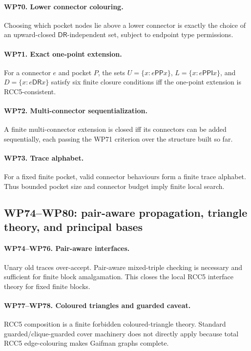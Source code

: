 \documentclass[11pt]{article}
\newcommand{\PP}{\mathsf{PP}}
\newcommand{\PPI}{\mathsf{PPI}}
\newcommand{\DR}{\mathsf{DR}}
\begin{document}
\paragraph{WP70. Lower connector colouring.}
Choosing which pocket nodes lie above a lower connector is exactly the choice of an upward-closed $\DR$-independent set, subject to endpoint type permissions.

\paragraph{WP71. Exact one-point extension.}
For a connector $e$ and pocket $P$, the sets $U=\{x:e\PP x\}$, $L=\{x:e\PPI x\}$, and $D=\{x:e\DR x\}$ satisfy six finite closure conditions iff the one-point extension is RCC5-consistent.

\paragraph{WP72. Multi-connector sequentialization.}
A finite multi-connector extension is closed iff its connectors can be added sequentially, each passing the WP71 criterion over the structure built so far.

\paragraph{WP73. Trace alphabet.}
For a fixed finite pocket, valid connector behaviours form a finite trace alphabet.  Thus bounded pocket size and connector budget imply finite local search.

\subsection{WP74--WP80: pair-aware propagation, triangle theory, and principal bases}
\paragraph{WP74--WP76. Pair-aware interfaces.}
Unary old traces over-accept.  Pair-aware mixed-triple checking is necessary and sufficient for finite block amalgamation.  This closes the local RCC5 interface theory for fixed finite blocks.

\paragraph{WP77--WP78. Coloured triangles and guarded caveat.}
RCC5 composition is a finite forbidden coloured-triangle theory.  Standard guarded/clique-guarded cover machinery does not directly apply because total RCC5 edge-colouring makes Gaifman graphs complete.
\end{document}

